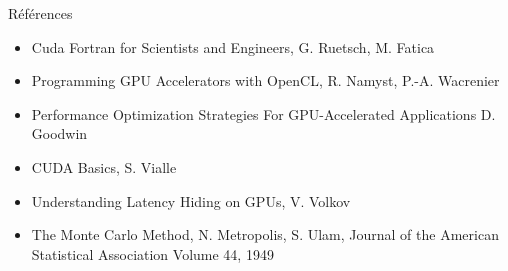 \documentclass[11pt,mathserif]{beamer}
\newcommand{\Pdf}{\faFilePdfO}
\newcommand{\liburu}{\faBook}
\begin{document}
\begin{frame}{Références}
\begin{itemize}[<+->]
  \item[\liburu] Cuda Fortran for Scientists and Engineers, G. Ruetsch, M. Fatica
  \item[\Pdf] Programming GPU Accelerators with OpenCL, R. Namyst, P.-A. Wacrenier \href{https://raymond-namyst.emi.u-bordeaux.fr/ens/pap/PAP-GPU.pdf}{}
  \item[\Pdf] Performance Optimization Strategies For GPU-Accelerated Applications D. Goodwin \href{https://on-demand.gputechconf.com/gtc/2013/presentations/S3046-Performance-Optimization-Strategies-for-GPU-Accelerated-Apps.pdf}{}
  \item[\faFilePowerpointO] CUDA Basics, S. Vialle \href{http://www.metz.supelec.fr/metz/personnel/vialle/course/PPS-5A-GPGPU/notes-de-cours-specifiques/PPS-GPU-02-CUDA-Basics-2spp.pdf}{}
  \item[\Pdf] Understanding Latency Hiding on GPUs, V. Volkov \href{http://www2.eecs.berkeley.edu/Pubs/TechRpts/2016/EECS-2016-143.pdf}{}
  \item[\Pdf] The Monte Carlo Method, N. Metropolis, S. Ulam,  Journal of the American Statistical Association Volume 44, 1949 
    \href{http://www.tandfonline.com/doi/abs/10.1080/01621459.1949.10483310}{}
\end{itemize}
\end{frame}
\end{document}
